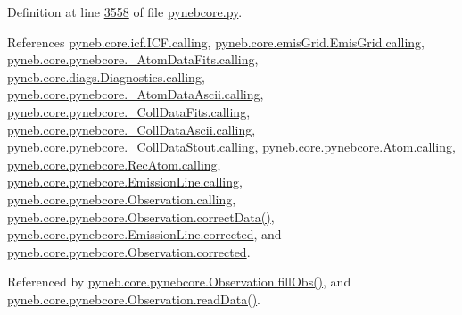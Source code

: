 Definition at line \hyperlink{pynebcore_8py_source_l03558}{3558} of file \hyperlink{pynebcore_8py_source}{pynebcore.\-py}.



References \hyperlink{icf_8py_source_l00016}{pyneb.\-core.\-icf.\-I\-C\-F.\-calling}, \hyperlink{emis_grid_8py_source_l00044}{pyneb.\-core.\-emis\-Grid.\-Emis\-Grid.\-calling}, \hyperlink{pynebcore_8py_source_l00097}{pyneb.\-core.\-pynebcore.\-\_\-\-Atom\-Data\-Fits.\-calling}, \hyperlink{diags_8py_source_l00169}{pyneb.\-core.\-diags.\-Diagnostics.\-calling}, \hyperlink{pynebcore_8py_source_l00318}{pyneb.\-core.\-pynebcore.\-\_\-\-Atom\-Data\-Ascii.\-calling}, \hyperlink{pynebcore_8py_source_l00585}{pyneb.\-core.\-pynebcore.\-\_\-\-Coll\-Data\-Fits.\-calling}, \hyperlink{pynebcore_8py_source_l00936}{pyneb.\-core.\-pynebcore.\-\_\-\-Coll\-Data\-Ascii.\-calling}, \hyperlink{pynebcore_8py_source_l01156}{pyneb.\-core.\-pynebcore.\-\_\-\-Coll\-Data\-Stout.\-calling}, \hyperlink{pynebcore_8py_source_l01229}{pyneb.\-core.\-pynebcore.\-Atom.\-calling}, \hyperlink{pynebcore_8py_source_l02643}{pyneb.\-core.\-pynebcore.\-Rec\-Atom.\-calling}, \hyperlink{pynebcore_8py_source_l03385}{pyneb.\-core.\-pynebcore.\-Emission\-Line.\-calling}, \hyperlink{pynebcore_8py_source_l03541}{pyneb.\-core.\-pynebcore.\-Observation.\-calling}, \hyperlink{pynebcore_8py_source_l04028}{pyneb.\-core.\-pynebcore.\-Observation.\-correct\-Data()}, \hyperlink{pynebcore_8py_source_l03386}{pyneb.\-core.\-pynebcore.\-Emission\-Line.\-corrected}, and \hyperlink{pynebcore_8py_source_l03545}{pyneb.\-core.\-pynebcore.\-Observation.\-corrected}.



Referenced by \hyperlink{pynebcore_8py_source_l03574}{pyneb.\-core.\-pynebcore.\-Observation.\-fill\-Obs()}, and \hyperlink{pynebcore_8py_source_l03711}{pyneb.\-core.\-pynebcore.\-Observation.\-read\-Data()}.


